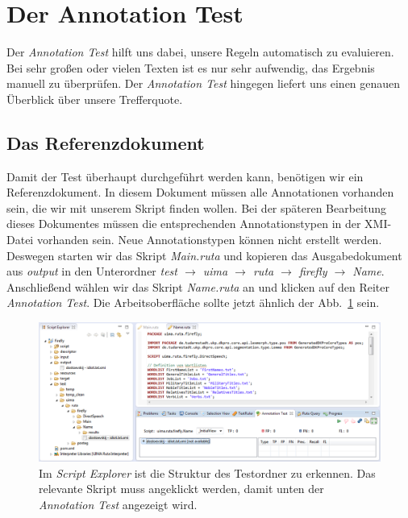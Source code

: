 \documentclass{article}
\begin{document}
\section{Der Annotation Test}
Der \textit{Annotation Test} hilft uns dabei, unsere Regeln automatisch zu evaluieren. Bei sehr großen oder vielen Texten ist es nur sehr aufwendig, das Ergebnis manuell zu überprüfen. Der \textit{Annotation Test} hingegen liefert uns einen genauen Überblick über unsere Trefferquote.

\subsection{Das Referenzdokument}

Damit der Test überhaupt durchgeführt werden kann, benötigen wir ein Referenzdokument. In diesem Dokument müssen alle Annotationen vorhanden sein, die wir mit unserem Skript finden wollen. Bei der späteren Bearbeitung dieses Dokumentes müssen die entsprechenden Annotationstypen in der XMI-Datei vorhanden sein. Neue Annotationstypen können nicht erstellt werden. Deswegen starten wir das Skript \textit{Main.ruta} und kopieren das Ausgabedokument aus \textit{output} in den Unterordner \textit{test $\rightarrow$ uima $\rightarrow$ ruta $\rightarrow$ firefly $\rightarrow$ Name}. Anschließend wählen wir das Skript \textit{Name.ruta} an und klicken auf den Reiter \textit{Annotation Test}. Die Arbeitsoberfläche sollte jetzt ähnlich der Abb.~\ref{test_main} sein.

\begin{figure}
\centering
\includegraphics[width=1\textwidth]{figs/test_main.png}
\caption{Im \textit{Script Explorer} ist die Struktur des Testordner zu erkennen. Das relevante Skript muss angeklickt werden, damit unten der \textit{Annotation Test} angezeigt wird.}
\label{test_main}
\end{figure}
\end{document}
